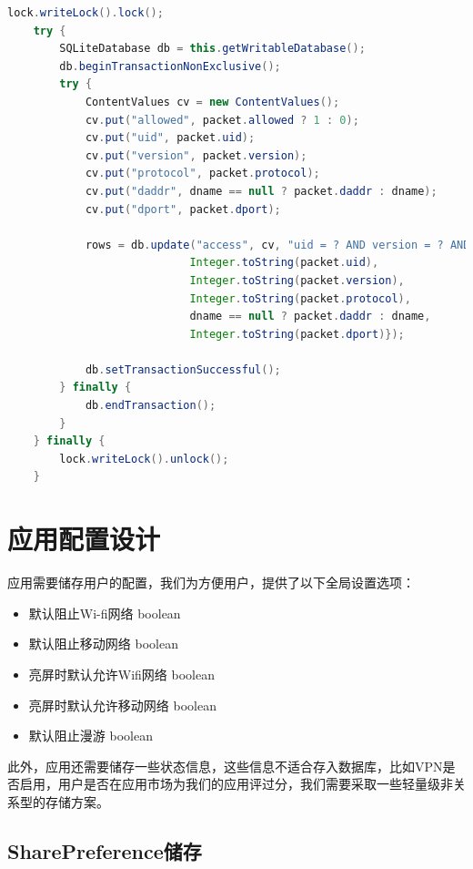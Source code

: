 \documentclass[format=final, language=chinese, degree=fyp]{hustthesis}
\begin{document}
\begin{lstlisting}[language=java]
    lock.writeLock().lock();
    try {
        SQLiteDatabase db = this.getWritableDatabase();
        db.beginTransactionNonExclusive();
        try {
            ContentValues cv = new ContentValues();
            cv.put("allowed", packet.allowed ? 1 : 0);
            cv.put("uid", packet.uid);
            cv.put("version", packet.version);
            cv.put("protocol", packet.protocol);
            cv.put("daddr", dname == null ? packet.daddr : dname);
            cv.put("dport", packet.dport);

            rows = db.update("access", cv, "uid = ? AND version = ? AND protocol = ? AND daddr = ? AND dport = ?", new String[]{
                            Integer.toString(packet.uid),
                            Integer.toString(packet.version),
                            Integer.toString(packet.protocol),
                            dname == null ? packet.daddr : dname,
                            Integer.toString(packet.dport)});

            db.setTransactionSuccessful();
        } finally {
            db.endTransaction();
        }
    } finally {
        lock.writeLock().unlock();
    }
\end{lstlisting}

\section{应用配置设计}

应用需要储存用户的配置，我们为方便用户，提供了以下全局设置选项：
\begin{itemize}
	\item 默认阻止Wi-fi网络        boolean
	\item 默认阻止移动网络          boolean
	\item 亮屏时默认允许Wifi网络     boolean
	\item 亮屏时默认允许移动网络      boolean
	\item 默认阻止漫游              boolean
\end{itemize}
此外，应用还需要储存一些状态信息，这些信息不适合存入数据库，比如VPN是否启用，用户是否在应用市场为我们的应用评过分，我们需要采取一些轻量级非关系型的存储方案。

\subsection{SharePreference储存}
\end{document}
